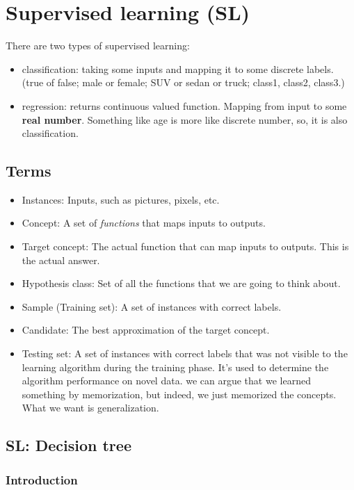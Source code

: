 \documentclass[12pt]{report}
\begin{document}
\chapter[Supervised learning]{Supervised learning (SL)}
\label{ch:sl}
There are two types of supervised learning:

\begin{itemize}
\item classification: taking some inputs and mapping it to some discrete labels. (true of false; male or female; SUV or sedan or truck; class1, class2, class3.)
\item regression: returns continuous valued function. Mapping from input to some \textbf{real number}. Something like age is more like discrete number, so, it is also classification.
\end{itemize}

\section{Terms}
\begin{itemize}
\item Instances: Inputs, such as pictures, pixels, etc.
\item Concept: A set of \textit{functions} that maps inputs to outputs.
\item Target concept: The actual function that can map inputs to outputs. This is the actual answer.
\item Hypothesis class: Set of all the functions that we are going to think about.
\item Sample (Training set): A set of instances with correct labels.
\item Candidate: The best approximation of the target concept.
\item Testing set: A set of instances with correct labels that was not visible to the learning algorithm during the training phase. It’s used to determine the algorithm performance on novel data. we can argue that we learned something by memorization, but indeed, we just memorized the concepts. What we want is generalization.
\end{itemize}


\section{SL: Decision tree}

\subsection{Introduction}
\end{document}
